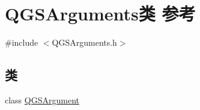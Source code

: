 \hypertarget{class_q_g_s_arguments}{}\section{Q\+G\+S\+Arguments类 参考}
\label{class_q_g_s_arguments}


{\ttfamily \#include $<$Q\+G\+S\+Arguments.\+h$>$}

\subsection*{类}
\begin{DoxyCompactItemize}
\item 
class \mbox{\hyperlink{class_q_g_s_arguments_1_1_q_g_s_argument}{Q\+G\+S\+Argument}}
\end{DoxyCompactItemize}

